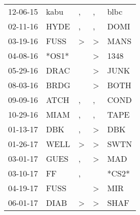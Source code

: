\begin{supertabular}{p{0.07\textwidth}p{0.06\textwidth}p{0.02\textwidth}p{0.02\textwidth}p{0.06\textwidth}}
          12-06-15\textsuperscript{} &           kabu\textsuperscript{} &                , &                , &           blbc\textsuperscript{} \\
          02-11-16\textsuperscript{} &           HYDE\textsuperscript{} &                , &                , &           DOMI\textsuperscript{} \\
          03-19-16\textsuperscript{} &           FUSS\textsuperscript{} &     \textgreater &     \textgreater &           MANS\textsuperscript{} \\
          04-08-16\textsuperscript{} &                            *OS1* &                  &     \textgreater &           1348\textsuperscript{} \\
          05-29-16\textsuperscript{} &           DRAC\textsuperscript{} &                  &     \textgreater &           JUNK\textsuperscript{} \\
          08-03-16\textsuperscript{} &           BRDG\textsuperscript{} &                  &     \textgreater &           BOTH\textsuperscript{} \\
          09-09-16\textsuperscript{} &           ATCH\textsuperscript{} &                , &                , &           COND\textsuperscript{} \\
          10-29-16\textsuperscript{} &           MIAM\textsuperscript{} &                , &                , &           TAPE\textsuperscript{} \\
          01-13-17\textsuperscript{} &            DBK\textsuperscript{} &                , &     \textgreater &            DBK\textsuperscript{} \\
          01-26-17\textsuperscript{} &           WELL\textsuperscript{} &     \textgreater &     \textgreater &           SWTN\textsuperscript{} \\
          03-01-17\textsuperscript{} &           GUES\textsuperscript{} &                , &     \textgreater &            MAD\textsuperscript{} \\
          03-10-17\textsuperscript{} &             FF\textsuperscript{} &                , &                  &                            *CS2* \\
          04-19-17\textsuperscript{} &           FUSS\textsuperscript{} &                  &     \textgreater &            MIR\textsuperscript{} \\
          06-01-17\textsuperscript{} &           DIAB\textsuperscript{} &     \textgreater &     \textgreater &           SHAF\textsuperscript{} \\

\end{supertabular}
